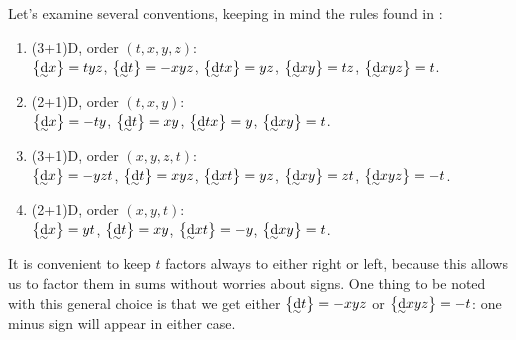 \documentclass[\ifafour a4paper,12pt,\else a5paper,10pt,\fi%
onecolumn,oneside,article,%
british%
]{memoir}
\theoremstyle{remark}
\theoremstyle{innote}
\newcommand*{\di}{\mathrm{d}}%
\DeclarePairedDelimiter\set{\{}{\}} %
\renewcommand*{\|}[1][]{\nonscript\:#1\vert\nonscript\:\mathopen{}}
\newcommand*{\eqns}{eqs}%
\newcommand*{\tw}[2][\scriptstyle\sim]{\smash[b]{\underset{\mathclap{{}^{#1}}}{#2}}}
\newcommand*{\ti}[1][\scriptstyle\sim]{\tw[#1]{\di}}
\begin{document}
Let's examine several conventions, keeping in mind the rules found in  \cites[\eqns~(5)--(11)]{burke1983}:
\begin{enumerate}[label=(\roman*),para]
\item (3+1)D, order $(t,x,y,z)$:\\
  $\set[\big]{\ti x} = tyz$,\;  $\set[\big]{\ti t} = -xyz$,\;
  $\set[\big]{\ti tx} = yz$,\;  $\set[\big]{\ti xy } = tz$,\;
  $\set[\big]{\ti xyz}=t$.
\item (2+1)D, order $(t,x,y)$:\\
  $\set[\big]{\ti x} = -ty$,\;  $\set[\big]{\ti t} = xy$,\;
  $\set[\big]{\ti tx} = y$,\;  $\set[\big]{\ti xy } = t$.
\item (3+1)D, order $(x,y,z,t)$:\\
  $\set[\big]{\ti x} = -yzt$,\;  $\set[\big]{\ti t} = xyz$,\;
  $\set[\big]{\ti xt} = yz$,\;  $\set[\big]{\ti xy } = zt$,\;
    $\set[\big]{\ti xyz}=-t$.
\item (2+1)D, order $(x,y,t)$:\\
  $\set[\big]{\ti x} = yt$,\;  $\set[\big]{\ti t} = xy$,\;
  $\set[\big]{\ti xt} = -y$,\;  $\set[\big]{\ti xy } = t$.
\end{enumerate}
It is convenient to keep $t$ factors always to either right or left, because this allows us to factor them in sums without worries about signs. One thing to be noted with this general choice is that we get either $\set[\big]{\ti t}=-xyz$ or $\set[\big]{\ti xyz}=-t$: one minus sign will appear in either case.
\end{document}
